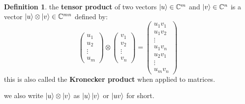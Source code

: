 \documentclass[11pt,a4paper]{article}
\theoremstyle{definition}
\newtheorem{definition}{Definition}[section]
\theoremstyle{remark}
\begin{document}
\begin{definition}
the \textbf{tensor product} of two vectors $\ket{u} \in \mathbb{C}^m$ and $\ket{v} \in \mathbb{C}^n$ is a vector $\ket{u} \otimes \ket{v} \in \mathbb{C}^{mn}$ defined by:
\[
\begin{pmatrix} u_1 \\ u_2 \\ \vdots \\ u_m \end{pmatrix} \otimes \begin{pmatrix} v_1 \\ v_2 \\ \vdots \\ v_n \end{pmatrix} = \begin{pmatrix} u_1 v_1 \\ u_1 v_2 \\ \vdots \\ u_1 v_n \\ u_2 v_1 \\ \vdots \\ u_m v_n \end{pmatrix}
\]
this is also called the \textbf{Kronecker product} when applied to matrices.
\end{definition}

we also write $\ket{u} \otimes \ket{v}$ as $\ket{u}\ket{v}$ or $\ket{uv}$ for short.
\end{document}
